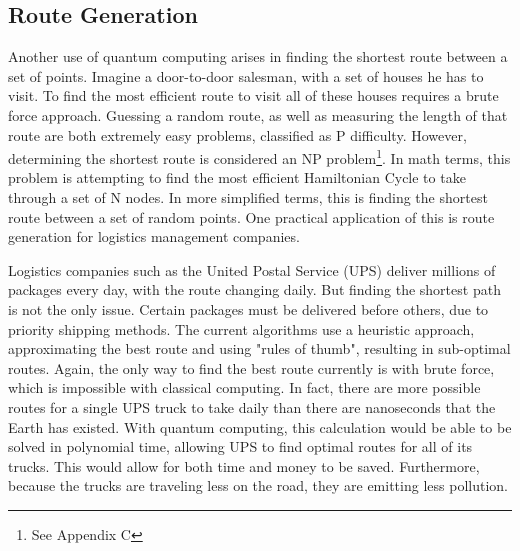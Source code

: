 \documentclass[10pt,journal,compsoc]{IEEEtran}
\begin{document}
\subsection{Route Generation}
Another use of quantum computing arises in finding the shortest route between a set of points. Imagine a door-to-door salesman, with a set of houses he has to visit. To find the most efficient route to visit all of these houses requires a brute force approach. Guessing a random route, as well as measuring the length of that route are both extremely easy problems, classified as P difficulty. However, determining the shortest route is considered an NP problem\footnote{See Appendix C }.
In math terms, this problem is attempting to find the most efficient Hamiltonian Cycle to take through a set of N nodes. In more simplified terms, this is finding the shortest route between a set of random points. One practical application of this is route generation for logistics management companies. 

Logistics companies such as the United Postal Service (UPS) deliver millions of packages every day, with the route changing daily. But finding the shortest path is not the only issue. Certain packages must be delivered before others, due to priority shipping methods. The current algorithms use a heuristic approach, approximating the best route and using "rules of thumb", resulting in sub-optimal routes. Again, the only way to find the best route currently is with brute force, which is impossible with classical computing. In fact, there are more possible routes for a single UPS truck to take daily than there are nanoseconds that the Earth has existed\cite{Fast}. With quantum computing, this calculation would be able to be solved in polynomial time, allowing UPS to find optimal routes for all of its trucks. This would allow for both time and money to be saved. Furthermore, because the trucks are traveling less on the road, they are emitting less pollution. 


 
\end{document}
